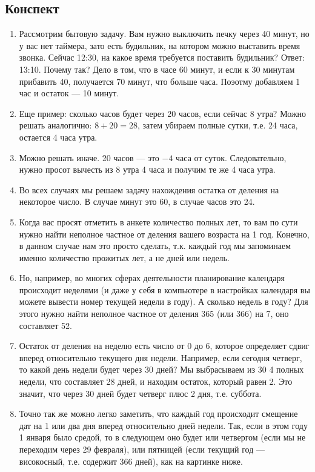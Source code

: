 \subsection*{Конспект}
\begin{enumerate}\setlength{\itemsep}{1pt}
\item Рассмотрим бытовую задачу. Вам нужно выключить печку через 40 минут, но у вас нет таймера, зато есть будильник, на котором можно выставить время звонка. Сейчас 12:30, на какое время требуется поставить будильник? Ответ: 13:10. Почему так? Дело в том, что в часе 60 минут, и если к 30 минутам прибавить 40, получается 70 минут, что больше часа. Поэотму добавляем 1 час и остаток --- 10 минут.
\item Еще пример: сколько часов будет через 20 часов, если сейчас 8 утра? Можно решать аналогично: $8+20=28$, затем убираем полные сутки, т.е. 24 часа, остается 4 часа утра.
\item Можно решать иначе. 20 часов --- это $-4$ часа от суток. Следовательно, нужно просот вычесть из 8 утра 4 часа и получим те же 4 часа утра.
\item Во всех случаях мы решаем задачу нахождения остатка от деления на некоторое число. В случае минут это 60, в случае часов это 24.
\item Когда вас просят отметить в анкете количество полных лет, то вам по сути нужно найти неполное частное от деления вашего возраста на 1 год. Конечно, в данном случае нам это просто сделать, т.к. каждый год мы запоминаем именно количество прожитых лет, а не дней или недель.
\item Но, например, во многих сферах деятельности планирование календаря происходит неделями (и даже у себя в компьютере в настройках календаря вы можете вывести номер текущей недели в году). А сколько недель в году? Для этого нужно найти неполное частное от деления 365 (или 366) на 7, оно составляет 52.
\item Остаток от деления на неделю есть число от 0 до 6, которое определяет сдвиг вперед относительно текущего дня недели. Например, если сегодня четверг, то какой день недели будет через 30 дней? Мы выбрасываем из 30 4 полных недели, что составляет 28 дней, и находим остаток, который равен 2. Это значит, что через 30 дней будет четверг плюс 2 дня, т.е. суббота.
\item Точно так же можно легко заметить, что каждый год происходит смещение дат на 1 или два дня вперед относительно дней недели. Так, если в этом году 1 января было средой, то в следующем оно будет или четвергом (если мы не переходим через 29 февраля), или пятницей (если текущий год --- високосный, т.е. содержит 366 дней), как на картинке ниже.


\end{enumerate}
